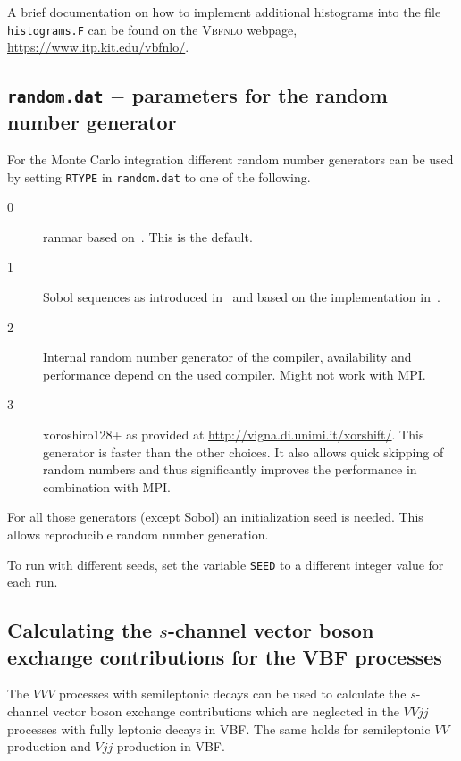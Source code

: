 \documentclass[english,12pt]{article}
\newcommand{\VBFNLO}{\textsc{Vbfnlo}}
\begin{document}
A brief documentation on how to implement additional histograms into the file {\tt histograms.F}
can be found on the \VBFNLO{} webpage,
\url{https://www.itp.kit.edu/vbfnlo/}.




\subsection{{\tt random.dat} $-$ parameters for the random number generator}
\label{sec:random}

For the Monte Carlo integration different random number generators can be used by setting
{\tt RTYPE} in {\tt random.dat} to one of the following.
\begin{description}
  \item[0] ranmar based on~\cite{MarsagliaZaman:1990}. This is the default.
  \item[1] Sobol sequences as introduced in~\cite{Sobol:1967} and based on the
    implementation in~\cite{BratleyFox:1988}.
  \item[2] Internal random number generator of the compiler, availability and performance
    depend on the used compiler. Might not work with MPI\@.
  \item[3] xoroshiro128+ as provided at \url{http://vigna.di.unimi.it/xorshift/}. This
    generator is faster than the other choices.
    It also allows quick skipping of random numbers and thus significantly improves the
    performance in combination with MPI\@.
\end{description}

For all those generators (except Sobol) an initialization seed is needed.
This allows reproducible random number generation.

To run with different seeds, set the variable {\tt SEED} 
to a different integer value for each run.




\subsection[Calculating the $s$-channel contributions for the VBF processes]{Calculating the $s$-channel vector boson exchange contributions for the VBF processes}
\label{sec:schan}
The $VVV$ processes with semileptonic decays can be used to calculate
the $s$-channel vector boson exchange contributions which are neglected in the $VVjj$ processes
with fully leptonic decays in VBF. The same holds for semileptonic $VV$ production and $Vjj$
production in VBF.
\end{document}
